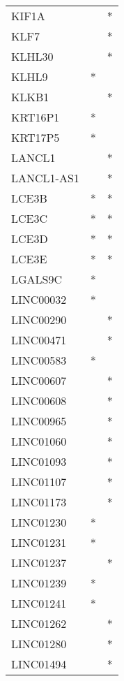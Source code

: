 \begin{longtable}{lcc}
KIF1A          &           &       * \\
KLF7           &           &       * \\
KLHL30         &           &       * \\
KLHL9          &         * &         \\
KLKB1          &           &       * \\
KRT16P1        &         * &         \\
KRT17P5        &         * &         \\
LANCL1         &           &       * \\
LANCL1-AS1     &           &       * \\
LCE3B          &         * &       * \\
LCE3C          &         * &       * \\
LCE3D          &         * &       * \\
LCE3E          &         * &       * \\
LGALS9C        &         * &         \\
LINC00032      &         * &         \\
LINC00290      &           &       * \\
LINC00471      &           &       * \\
LINC00583      &         * &         \\
LINC00607      &           &       * \\
LINC00608      &           &       * \\
LINC00965      &           &       * \\
LINC01060      &           &       * \\
LINC01093      &           &       * \\
LINC01107      &           &       * \\
LINC01173      &           &       * \\
LINC01230      &         * &         \\
LINC01231      &         * &         \\
LINC01237      &           &       * \\
LINC01239      &         * &         \\
LINC01241      &         * &         \\
LINC01262      &           &       * \\
LINC01280      &           &       * \\
LINC01494      &           &       * \\

\end{longtable}
